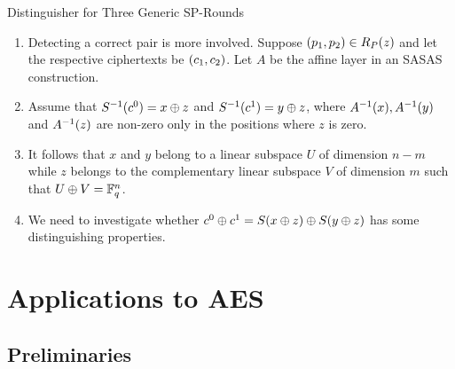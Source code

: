 \documentclass[notheorems]{beamer}
\theoremstyle{definition}
\theoremstyle{example}
\begin{document}
    \begin{frame}[<+->]{Distinguisher for Three Generic SP-Rounds}
        \begin{enumerate}
            \item Detecting a correct pair is more involved. Suppose
            \((p_1, p_2) \in R_P(z)\) and let the respective
            ciphertexts be \((c_1, c_2)\). Let \(A\) be the affine layer in
            an SASAS construction. 
            \item Assume that \(S^{-1}(c^0) = x \oplus z\) and
            \(S^{-1}(c^1) = y \oplus z\), where \(A^{-1}(x),
            A^{-1}(y)\) and \(A^{-1}(z)\) are non-zero only in the
            positions where \(z\) is zero. 
            \item It follows that \(x\) and \(y\) belong to a linear subspace
            \(U\) of dimension \(n - m\) while \(z\) belongs to the
            complementary linear subspace \(V\) of dimension \(m\) such that \(U
            \oplus V = \mathbb F_q^n\). 
            \item We need to investigate whether \(c^0 \oplus c^1 = S(x
            \oplus z) \oplus S(y \oplus z)\) has some distinguishing
            properties.
        \end{enumerate}
    \end{frame}

    \section{Applications to AES}
    \label{sec:aes}

    \subsection{Preliminaries}
    \label{subsec:aes-prelims}
\end{document}
